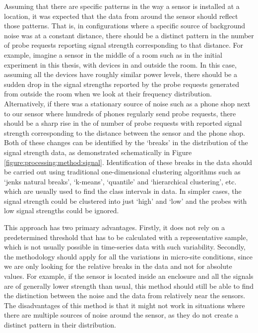 Assuming that there are specific patterns in the way a sensor is installed at a location, it was expected that the data from around the sensor should reflect those patterns.
That is, in configurations where a specific source of background noise was at a constant distance, there should be a distinct pattern in the number of probe requests reporting signal strength corresponding to that distance.
For example, imagine a sensor in the middle of a room such as in the initial experiment in this thesis, with devices in and outside the room.
In this case, assuming all the devices have roughly similar power levels, there should be a sudden drop in the signal strengths reported by the probe requests generated from outside the room when we look at their frequency distribution.
Alternatively, if there was a stationary source of noise such as a phone shop next to our sensor where hundreds of phones regularly send probe requests, there should  be a sharp rise in the of number of probe requests with reported signal strength corresponding to the distance between the sensor and the phone shop.
Both of these changes can be identified by the ‘breaks’ in the distribution of the signal strength data, as demonstrated schematically in Figure \ref{figure:processing:method:signal}.
Identification of these breaks in the data should be carried out using traditional one-dimensional clustering algorithms such as ‘jenks natural breaks’, ‘k-means’, ‘quantile’ and ‘hierarchical clustering’, etc.
 which are usually used to find the class intervals in data.
In simpler cases, the signal strength could be clustered into just ‘high’ and ‘low’ and the probes with low signal strengths could be ignored.

This approach has two primary advantages.
Firstly, it does not rely on a predetermined threshold that has to be calculated with a representative sample, which is not usually possible in time-series data with such variability.
Secondly, the methodology should apply for all the variations in micro-site conditions, since we are only looking for the relative breaks in the data and not for absolute values.
For example, if the sensor is located inside an enclosure and all the signals are of generally lower strength than usual, this method should still be able to find the distinction between the noise and the data from relatively near the sensors.
The disadvantages of this method is that it might not work in situations where there are multiple sources of noise around the sensor, as they do not create a distinct pattern in their distribution.

